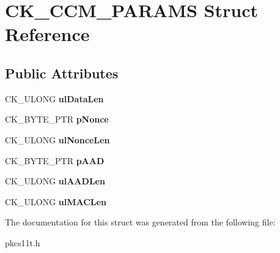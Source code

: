 \hypertarget{struct_c_k___c_c_m___p_a_r_a_m_s}{}\section{C\+K\+\_\+\+C\+C\+M\+\_\+\+P\+A\+R\+A\+MS Struct Reference}
\label{struct_c_k___c_c_m___p_a_r_a_m_s}
\subsection*{Public Attributes}
\begin{DoxyCompactItemize}
\item 
\mbox{\label{struct_c_k___c_c_m___p_a_r_a_m_s_ae9ec7e937591d68717b5ff67caf90a01}} 
C\+K\+\_\+\+U\+L\+O\+NG {\bfseries ul\+Data\+Len}
\item 
\mbox{\label{struct_c_k___c_c_m___p_a_r_a_m_s_a1bbd562ff81b179469bb78b3b6b7b30e}} 
C\+K\+\_\+\+B\+Y\+T\+E\+\_\+\+P\+TR {\bfseries p\+Nonce}
\item 
\mbox{\label{struct_c_k___c_c_m___p_a_r_a_m_s_a65b1faec3bf71987b3bd543008c2c553}} 
C\+K\+\_\+\+U\+L\+O\+NG {\bfseries ul\+Nonce\+Len}
\item 
\mbox{\label{struct_c_k___c_c_m___p_a_r_a_m_s_aa74a1780a01e73aa9e37644d6c972d43}} 
C\+K\+\_\+\+B\+Y\+T\+E\+\_\+\+P\+TR {\bfseries p\+A\+AD}
\item 
\mbox{\label{struct_c_k___c_c_m___p_a_r_a_m_s_a1c0f96ea1b270545d2bbcce571410c32}} 
C\+K\+\_\+\+U\+L\+O\+NG {\bfseries ul\+A\+A\+D\+Len}
\item 
\mbox{\label{struct_c_k___c_c_m___p_a_r_a_m_s_a893590a9361df0b99a2d79de1bde1230}} 
C\+K\+\_\+\+U\+L\+O\+NG {\bfseries ul\+M\+A\+C\+Len}
\end{DoxyCompactItemize}


The documentation for this struct was generated from the following file\+:\begin{DoxyCompactItemize}
\item 
pkcs11t.\+h\end{DoxyCompactItemize}
